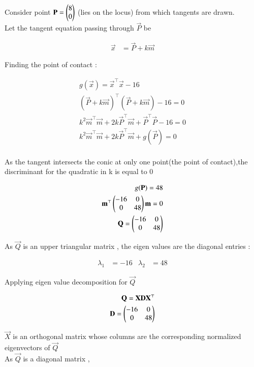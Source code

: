 \documentclass[journal,12pt,onecolumn]{IEEEtran}
\begin{document}
	
	Consider point $\mathbf{P} = \begin{pmatrix}8\\0\end{pmatrix}$ (lies on the locus) from which tangents are drawn.\\
	
	Let the tangent equation passing through $\vec{P}$ be 
	
	\begin{align}
		\vec{x} &= \vec{P} + k\vec{m}
	\end{align}
	
	Finding the point of contact :
	
	\begin{align}
		g(\vec{x}) = \vec{x}^\top\vec{x} - 16 \label{eq:circle}\\
		(\vec{P}+k\vec{m})^\top(\vec{P}+k\vec{m}) - 16 = 0\\
		k^2\vec{m}^\top\vec{m} + 2k\vec{P}^\top\vec{m} + \vec{P}^\top\vec{P} - 16 = 0\\
		k^2\vec{m}^\top\vec{m} + 2k\vec{P}^\top\vec{m} + g(\vec{P}) = 0\\
	\end{align}
	
	As the tangent intersects the conic at only one point(the point of contact),the discriminant for the quadratic in k is equal to 0
	
	\begin{align}
		g(\mathbf{P}) = 48\\
		\mathbf{m}^\top\begin{pmatrix}-16 & 0\\0 & 48\end{pmatrix}\mathbf{m} = 0 \label{eq:mqm} \\
		\mathbf{Q} = \begin{pmatrix}-16 & 0\\0 & 48\end{pmatrix}\\ 
	\end{align}
	
	As $\vec{Q}$ is an upper triangular matrix , the eigen values are the diagonal entries :
	
	\begin{align}
		\lambda_1 &= -16 & \lambda_2 &= 48
	\end{align}
	
	Applying eigen value decomposition for $\vec{Q}$ 
	
	\begin{align}
		\mathbf{Q} = \mathbf{X}\mathbf{D}\mathbf{X}^\top\\
		\mathbf{D} = \begin{pmatrix}-16 & 0\\0 & 48\end{pmatrix}
	\end{align}
	
	$\vec{X}$ is an orthogonal matrix whose columns are the corresponding normalized eigenvectors of $\vec{Q}$\\
	As $\vec{Q}$ is a diagonal matrix , 
	
\end{document}
